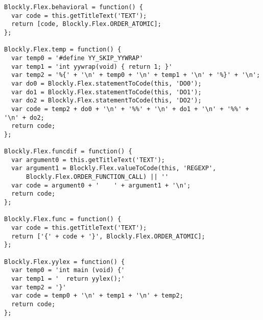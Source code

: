 \documentclass{risepaper}
\begin{document}
\begin{verbatim}
Blockly.Flex.behavioral = function() {
  var code = this.getTitleText('TEXT');
  return [code, Blockly.Flex.ORDER_ATOMIC];
};

Blockly.Flex.temp = function() {
  var temp0 = '#define YY_SKIP_YYWRAP'
  var temp1 = 'int yywrap(void) { return 1; }'
  var temp2 = '%{' + '\n' + temp0 + '\n' + temp1 + '\n' + '%}' + '\n';
  var do0 = Blockly.Flex.statementToCode(this, 'DO0');
  var do1 = Blockly.Flex.statementToCode(this, 'DO1');
  var do2 = Blockly.Flex.statementToCode(this, 'DO2');
  var code = temp2 + do0 + '\n' + '%%' + '\n' + do1 + '\n' + '%%' + '\n' + do2;
  return code;
};

Blockly.Flex.funcdif = function() {
  var argument0 = this.getTitleText('TEXT');
  var argument1 = Blockly.Flex.valueToCode(this, 'REGEXP',
      Blockly.Flex.ORDER_FUNCTION_CALL) || ''
  var code = argument0 + '    ' + argument1 + '\n';
  return code;
};

Blockly.Flex.func = function() {
  var code = this.getTitleText('TEXT');
  return ['{' + code + '}', Blockly.Flex.ORDER_ATOMIC];
};

Blockly.Flex.yylex = function() {
  var temp0 = 'int main (void) {'
  var temp1 = '  return yylex();'
  var temp2 = '}'
  var code = temp0 + '\n' + temp1 + '\n' + temp2;
  return code;
};
\end{verbatim}

\insertindex %
\printindex
  
\end{document}
